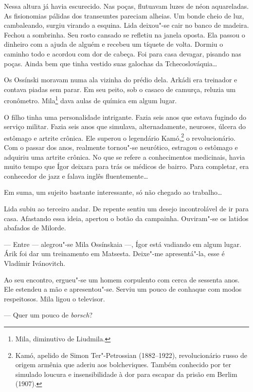\bigskip

Nessa altura já havia escurecido. Nas poças, flutuavam luzes de néon
aquareladas. As fisionomias pálidas dos transeuntes pareciam alheias. Um
bonde cheio de luz, cambaleando, surgiu virando a esquina. Lida
deixou"-se cair no banco de madeira. Fechou a sombrinha. Seu rosto
cansado se refletiu na janela oposta. Ela passou o dinheiro com a ajuda
de alguém e recebeu um tíquete de volta. Dormiu o caminho todo e acordou
com dor de cabeça. Foi para casa devagar, pisando nas poças. Ainda bem
que tinha vestido suas galochas da Tchecoslováquia\ldots{}

Os Ossínski moravam numa ala vizinha do prédio dela. Arkádi era treinador e
contava piadas sem parar. Em seu peito, sob o casaco de camurça, reluzia
um cronômetro. Mila\footnote{Mila, diminutivo de Liudmila.} dava aulas de química em algum lugar.

O filho tinha uma personalidade intrigante. Fazia seis anos que estava
fugindo do serviço militar. Fazia seis anos que simulava,
alternadamente, neuroses, úlcera do estômago e artrite crônica. Ele
superou o legendário Kamó,\footnote{Kamó, apelido de Simon
  Ter"-Petrossian (1882--1922), revolucionário russo de origem armênia
  que aderiu aos bolcheviques. Também conhecido por ter simulado loucura
  e insensibilidade à dor para escapar da prisão em Berlim (1907).} o
revolucionário. Com o passar dos anos, realmente tornou"-se neurótico,
estragou o estômago e adquiriu uma artrite crônica. No que se refere a
conhecimentos medicinais, havia muito tempo que Ígor deixara para trás
os médicos de bairro. Para completar, era conhecedor de jazz e falava
inglês fluentemente\ldots{}

Em suma, um sujeito bastante interessante, só não chegado ao trabalho\ldots{}

Lida subiu ao terceiro andar. De repente sentiu um desejo incontrolável
de ir para casa. Afastando essa ideia, apertou o botão da campainha.
Ouviram"-se os latidos abafados de Milorde.

--- Entre --- alegrou"-se Mila Ossínskaia ---, Ígor está vadiando em
algum lugar. Árik foi dar um treinamento em Matsesta. Deixe"-me
apresentá"-la, esse é Vladímir Ivánovitch.

Ao seu encontro, ergueu"-se um homem corpulento com cerca de sessenta
anos. Ele estendeu a mão e apresentou"-se. Serviu um pouco de conhaque
com modos respeitosos. Mila ligou o televisor.

--- Quer um pouco de \emph{borsch}?

